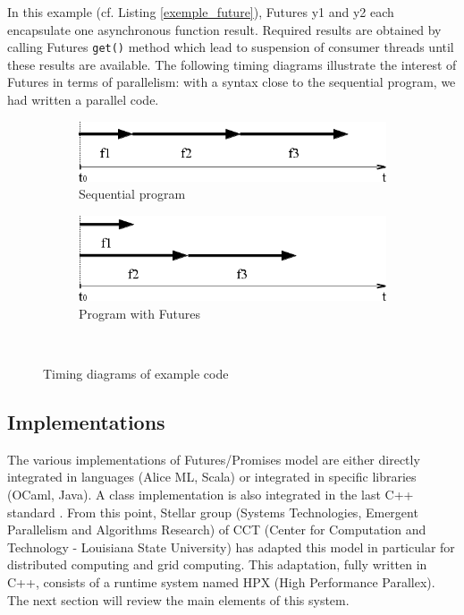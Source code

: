 \documentclass[conference]{acmsig-alternate-10pt}
\begin{document}
In this example (cf. Listing \ref{exemple_future}), Futures y1 and y2 each encapsulate one asynchronous function result. Required results are obtained by calling Futures \texttt{get()} method which lead to suspension of consumer threads until these results are available. The following timing diagrams illustrate the interest of Futures in terms of parallelism: with a syntax close to the sequential program, we had written a parallel code.

\begin{figure}[h]
      \begin{subfigure}[b]{0.5\textwidth}
	      \centering
	      \includegraphics[scale=0.5]{Images/Im2.png}
	      \caption{Sequential program}
      \end{subfigure}
      \begin{subfigure}[b]{0.5\textwidth}
	      \centering
	      \includegraphics[scale=0.5]{Images/Im3.png}
	      \caption{Program with Futures}
      \end{subfigure}\\
      
      \caption{Timing diagrams of example code}
      \label{chronofuture}
\end{figure}

\subsection{Implementations}
The various implementations of Futures/Promises model are either directly integrated in languages (Alice ML, Scala) or integrated in specific libraries (OCaml, Java). A class implementation is also integrated in the last C++ standard \cite{Futuresc++}. From this point, Stellar group (Systems Technologies, Emergent Parallelism and Algorithms Research) of CCT (Center for Computation and Technology - Louisiana State University) has adapted this model in particular for distributed computing and grid computing. This adaptation, fully written in C++, consists of a runtime system named HPX (High Performance Parallex). The next section will review the main elements of this system.   
\end{document}
